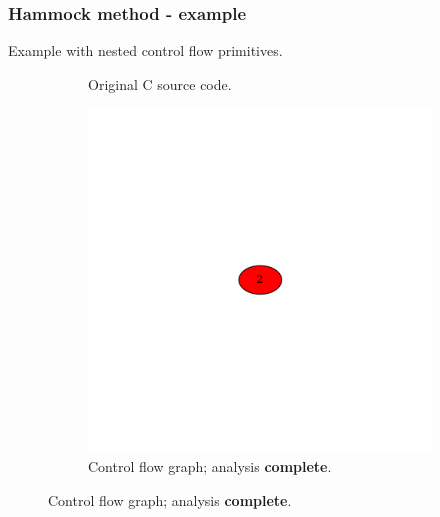 \documentclass[aspectratio=1610]{beamer}
\begin{document}
\begin{frame}[noframenumbering]
	\frametitle{Hammock method - example}
	Example with nested control flow primitives.
	\begin{figure}[htbp]
		\centering
		\begin{subfigure}[b]{0.30\textwidth}
			\centering
			
			\caption{Original C source code.}
		\end{subfigure}
		\begin{subfigure}[b]{0.50\textwidth}
			\centering
			\includegraphics[height=0.6\paperheight]{inc/methods/hammock/example/without-break/main_0004b.png}
			\caption{Control flow graph; analysis \textbf{complete}.}
		\end{subfigure}
	\end{figure}
\end{frame}



\end{document}
